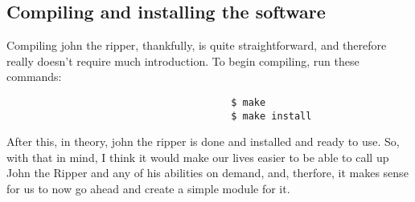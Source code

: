 \documentclass[]{article}
\begin{document}
                                       \subsection{Compiling and installing the software}
                                       Compiling john the ripper, thankfully, is quite straightforward, and therefore really doesn't require much introduction. To begin 
                                       compiling, run these commands:
                                       \begin{lstlisting}
                                       $ make
                                       $ make install
                                       \end{lstlisting}
                                       After this, in theory, john the ripper is done and installed and ready to use. So, with that in mind, I think it would make our lives 
                                       easier to be able to call up John the Ripper and any of his abilities on demand, and, therfore, it makes sense for us to now go ahead 
                                       and create a simple module for it.
\end{document}
